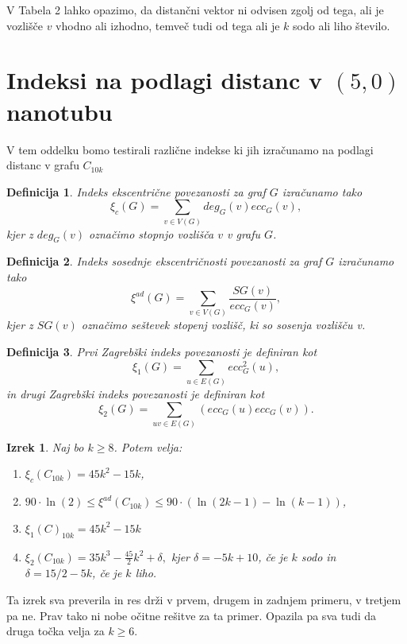 \documentclass[a4paper, 12pt]{article}
\newtheorem{izrek}{Izrek}[section]
\newtheorem{definicija}{Definicija}[section]
\begin{document}
V Tabela 2 lahko opazimo, da distančni vektor ni odvisen zgolj od tega, ali je vozlišče $v$ vhodno ali izhodno, temveč tudi od tega ali je $k$ sodo ali liho število.

\section{Indeksi na podlagi distanc v $(5,0)$ nanotubu}

V tem oddelku bomo testirali različne indekse ki jih izračunamo na podlagi distanc v grafu $C_{10k}$

\begin{definicija}
    Indeks ekscentrične povezanosti za graf $G$ izračunamo tako
    $$
    \xi_{c}(G) = \sum_{v \in V(G)}deg_G(v)ecc_G(v),
    $$
    kjer z $deg_G(v)$ označimo stopnjo vozlišča $v$ v grafu $G$.
\end{definicija}

\begin{definicija}
    Indeks sosednje ekscentričnosti povezanosti za graf $G$ izračunamo tako
    $$
    \xi^{ad}(G) = \sum_{v \in V(G)}\frac{SG(v)}{ecc_G(v)},
    $$
    kjer z $SG(v)$ označimo seštevek stopenj vozlišč, ki so sosenja vozlišču v.
\end{definicija}

\begin{definicija}
    Prvi Zagrebški indeks povezanosti je definiran kot
    $$
    \xi_{1}(G) = \sum_{u \in E(G)}ecc_G^2(u),
    $$
    in drugi Zagrebški indeks povezanosti je definiran kot
    $$
    \xi_{2}(G) = \sum_{uv \in E(G)}(ecc_G(u)ecc_G(v)).
    $$
\end{definicija}

\begin{izrek}
    Naj bo $k \geq 8$. Potem velja:
    \begin{enumerate}
        \item $\xi_{c}(C_{10k}) = 45k^2 - 15k$,
        \item $90 \cdot \ln(2) \leq \xi^{ad}(C_{10k}) \leq 90 \cdot (\ln(2k - 1) - \ln(k - 1))$,
        \item $\xi_{1}(C)_{10k} = 45k^2 - 15k$
        \item $\xi_{2}(C_{10k}) = 35k^3 - \frac{45}{2}k^2 + \delta,$ kjer $\delta = -5k + 10$, če je $k$ sodo in $\delta = 15 / 2 - 5 k$, če je $k$ liho. 
    \end{enumerate}
\end{izrek}

Ta izrek sva preverila in res drži v prvem, drugem in zadnjem primeru, v tretjem pa ne. Prav tako ni nobe očitne rešitve za ta primer. 
Opazila pa sva tudi da druga točka velja za $k \geq 6$.
\end{document}

